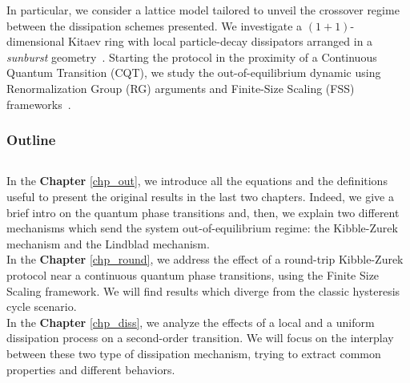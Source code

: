 In particular, we consider a lattice model tailored to unveil the crossover regime between the  dissipation schemes presented. We investigate a $(1+1)$-dimensional Kitaev ring with local particle-decay dissipators arranged in a \textit{sunburst} geometry~\cite{FRV-staticsunburst, FRV-timesunburst, MS-2022-sunburstquench}.
Starting the protocol in the proximity of a Continuous Quantum Transition (CQT), we study the out-of-equilibrium dynamic using Renormalization Group (RG) arguments and Finite-Size Scaling (FSS) frameworks~\cite{C-1996-ScalingandRG, RV-2021-coherentanddissipativedynamicsreview}.





\subsubsection{Outline}
$ $

In the \textbf{Chapter} \ref{chp_out}, we introduce all the equations and the definitions
useful to present the original results in the last two chapters. Indeed, we give a brief
intro on the quantum phase transitions and, then, we explain two different mechanisms
which send the system out-of-equilibrium regime: the Kibble-Zurek mechanism and the
Lindblad mechanism.\\

In the \textbf{Chapter} \ref{chp_round}, we address the effect of a round-trip Kibble-Zurek
protocol near a continuous quantum phase transitions, using the Finite Size Scaling 
framework. We will find results which diverge from the classic hysteresis cycle scenario.\\

In the \textbf{Chapter} \ref{chp_diss}, we analyze the effects of a local and a uniform
dissipation process on a second-order transition. We will focus on the interplay between
these two type of dissipation mechanism, trying to extract common properties and different
behaviors.

